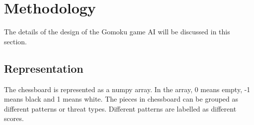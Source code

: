 \documentclass[conference,compsoc]{IEEEtran}
\begin{document}
%






\section{Methodology}
The details of the design of the Gomoku game AI will be discussed in this section.


\subsection{Representation}
The chessboard is represented as a numpy array. In the array, 0 means empty, -1 means black and 1 means white. The pieces in chessboard can be grouped as different patterns or threat types. Different patterns are labelled as different scores.
\end{document}
